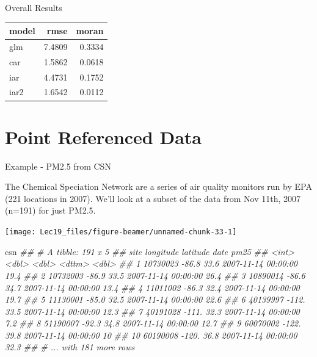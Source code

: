 \documentclass[11pt,ignorenonframetext,]{beamer}
\newenvironment{Shaded}{}{}
\newcommand{\CommentTok}[1]{\textcolor[rgb]{0.38,0.63,0.69}{\textit{#1}}}
\newcommand{\NormalTok}[1]{#1}
\let\oldShaded\Shaded
\let\endoldShaded\endShaded
\renewenvironment{Shaded}{\footnotesize\begin{spacing}{0.9}\oldShaded}{\endoldShaded\end{spacing}}
\begin{document}
\begin{frame}{Overall Results}
\protect\hypertarget{overall-results}{}

\begin{longtable}[]{@{}lrr@{}}
\toprule
model & rmse & moran\tabularnewline
\midrule
\endhead
glm & 7.4809 & 0.3334\tabularnewline
car & 1.5862 & 0.0618\tabularnewline
iar & 4.4731 & 0.1752\tabularnewline
iar2 & 1.6542 & 0.0112\tabularnewline
\bottomrule
\end{longtable}

\end{frame}

\hypertarget{point-referenced-data}{%
\section{Point Referenced Data}\label{point-referenced-data}}

\begin{frame}{Example - PM2.5 from CSN}
\protect\hypertarget{example---pm2.5-from-csn}{}

The Chemical Speciation Network are a series of air quality monitors run
by EPA (221 locations in 2007). We'll look at a subset of the data from
Nov 11th, 2007 (n=191) for just PM2.5.

\begin{center}\texttt{[image: Lec19\_files/figure-beamer/unnamed-chunk-33-1]} \end{center}

\end{frame}

\begin{frame}[fragile]{}
\protect\hypertarget{section-2}{}

\begin{Shaded}
\begin{Highlighting}[]
\NormalTok{csn}
\CommentTok{## # A tibble: 191 x 5}
\CommentTok{##        site longitude latitude date                 pm25}
\CommentTok{##       <int>     <dbl>    <dbl> <dttm>              <dbl>}
\CommentTok{##  1 10730023     -86.8     33.6 2007-11-14 00:00:00  19.4}
\CommentTok{##  2 10732003     -86.9     33.5 2007-11-14 00:00:00  26.4}
\CommentTok{##  3 10890014     -86.6     34.7 2007-11-14 00:00:00  13.4}
\CommentTok{##  4 11011002     -86.3     32.4 2007-11-14 00:00:00  19.7}
\CommentTok{##  5 11130001     -85.0     32.5 2007-11-14 00:00:00  22.6}
\CommentTok{##  6 40139997    -112.      33.5 2007-11-14 00:00:00  12.3}
\CommentTok{##  7 40191028    -111.      32.3 2007-11-14 00:00:00   7.2}
\CommentTok{##  8 51190007     -92.3     34.8 2007-11-14 00:00:00  12.7}
\CommentTok{##  9 60070002    -122.      39.8 2007-11-14 00:00:00  10  }
\CommentTok{## 10 60190008    -120.      36.8 2007-11-14 00:00:00  32.3}
\CommentTok{## # ... with 181 more rows}
\end{Highlighting}
\end{Shaded}

\end{frame}
\end{document}
